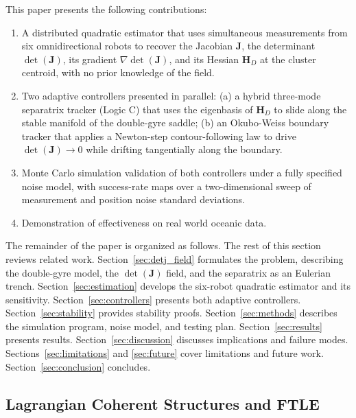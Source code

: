 \documentclass[lettersize,journal]{IEEEtran}
\begin{document}
This paper presents the following contributions:
\begin{enumerate}
    \item A distributed quadratic estimator that uses simultaneous measurements
          from six omnidirectional robots to recover the Jacobian $\mathbf{J}$,
          the determinant $\det(\mathbf{J})$, its gradient
          $\nabla\det(\mathbf{J})$, and its Hessian $\mathbf{H}_D$ at the cluster
          centroid, with no prior knowledge of the field.
    \item Two adaptive controllers presented in parallel: (a) a hybrid three-mode
          separatrix tracker (Logic C) that uses the eigenbasis of
          $\mathbf{H}_D$ to slide along the stable manifold of the double-gyre
          saddle; (b) an Okubo-Weiss boundary tracker that applies a Newton-step
          contour-following law to drive $\det(\mathbf{J}) \to 0$ while drifting
          tangentially along the boundary.

    \item Monte Carlo simulation validation of both controllers under a fully
          specified noise model, with success-rate maps over a two-dimensional
          sweep of measurement and position noise standard deviations.

    \item Demonstration of effectiveness on real world oceanic data.
\end{enumerate}

The remainder of the paper is organized as follows. The rest of this
section reviews related work. Section~\ref{sec:detj_field} formulates the
problem, describing the double-gyre model, the $\det(\mathbf{J})$ field, and
the separatrix as an Eulerian trench.
Section~\ref{sec:estimation} develops the six-robot quadratic estimator
and its sensitivity. Section~\ref{sec:controllers} presents both adaptive
controllers.
Section~\ref{sec:stability} provides stability proofs.
Section~\ref{sec:methods} describes the simulation program, noise model, and
testing plan. Section~\ref{sec:results} presents results.
Section~\ref{sec:discussion} discusses implications and failure modes.
Sections~\ref{sec:limitations} and \ref{sec:future} cover limitations and
future work. Section~\ref{sec:conclusion} concludes.



\subsection{Lagrangian Coherent Structures and FTLE}
\end{document}
